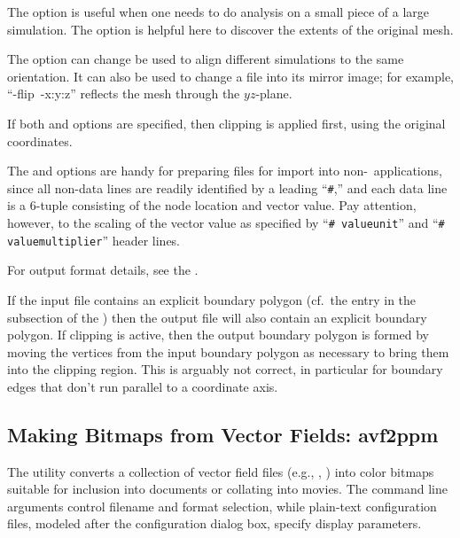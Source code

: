 The  option is useful when one needs to do analysis on a
small piece of a large simulation.  The  option is helpful
here to discover the extents of the original mesh.

The  option can change be used to align different simulations
to the same orientation.  It can also be used to change a file into its
mirror image; for example, ``-flip~-x:y:z'' reflects the mesh through
the $yz$-plane.

If both  and  options are specified, then clipping is
applied first, using the original coordinates.

The  and  options are handy for
preparing files for import into non-\OOMMF\ applications, since all
non-data lines are readily identified by a leading ``\verb+#+,'' and
each data line is a 6-tuple consisting of the node location and vector
value.  Pay attention, however, to the scaling of the vector value as
specified by ``\verb+# valueunit+'' and ``\verb+# valuemultiplier+''
header lines.

For output format details, see the .


If the input file contains an explicit boundary polygon (cf.\ the
 entry in the  subsection of the {}) then the
output file will also contain an explicit boundary polygon.  If clipping
is active, then the output boundary polygon is formed by moving the
vertices from the input boundary polygon as necessary to bring them into
the clipping region.  This is arguably not correct, in particular for
boundary edges that don't run parallel to a coordinate axis.



\subsection{Making Bitmaps from Vector Fields:
            avf2ppm}\label{sec:avf2ppm}%
%

The  utility converts a
collection of vector field files (e.g., , ) into color
bitmaps suitable for inclusion into documents or collating into movies.
The command line arguments control filename and format selection, while
plain-text configuration files, modeled after the
{} configuration dialog
box, specify display parameters.

